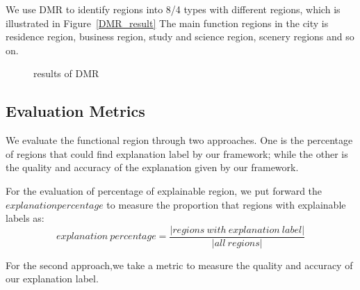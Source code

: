 \documentclass[runningheads]{llncs}
\begin{document}
We use DMR to identify regions into 8/4 types with different regions, which is illustrated in Figure~\ref{DMR_result}
The main function regions in the city is residence region, business region, study and science region, scenery regions and so on.

\begin{figure}[h]
\centering
{}
\caption{results of DMR}
\label{The results of functional region identification}
\end{figure}

\subsection{Evaluation Metrics}
We evaluate the functional region through two approaches. One is the percentage of regions that could find explanation label by our framework; while the other is the quality and accuracy of the explanation given by our framework.

For the evaluation of percentage of explainable region, we put forward the $explanation percentage$ to measure the proportion that regions with explainable labels as:
$$explanation\ percentage=\frac{|regions\ with\ explanation\ label|}{|all\ regions|}$$

For the second approach,we take a metric to measure the quality and accuracy of our explanation label.
\end{document}

